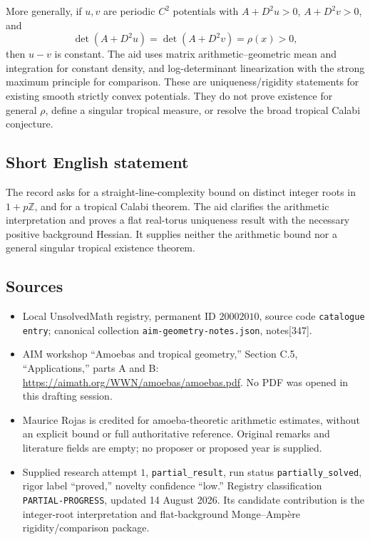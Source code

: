\documentclass[11pt]{article}
\newcommand{\Z}{\mathbb{Z}}
\begin{document}
More generally, if \(u,v\) are periodic \(C^2\) potentials with \(A+D^2u>0\), \(A+D^2v>0\), and
\[
 \det(A+D^2u)=\det(A+D^2v)=\rho(x)>0,
\]
then \(u-v\) is constant. The aid uses matrix arithmetic--geometric mean and integration for constant density, and log-determinant linearization with the strong maximum principle for comparison. These are uniqueness/rigidity statements for existing smooth strictly convex potentials. They do not prove existence for general \(\rho\), define a singular tropical measure, or resolve the broad tropical Calabi conjecture.
\subsection{Short English statement}
The record asks for a straight-line-complexity bound on distinct integer roots in \(1+p\Z\), and for a tropical Calabi theorem. The aid clarifies the arithmetic interpretation and proves a flat real-torus uniqueness result with the necessary positive background Hessian. It supplies neither the arithmetic bound nor a general singular tropical existence theorem.
\subsection{Sources}
\begin{itemize}
\item Local UnsolvedMath registry, permanent ID \(20002010\), source code \texttt{catalogue entry}; canonical collection \texttt{aim-geometry-notes.json}, notes[347].
\item AIM workshop ``Amoebas and tropical geometry,'' Section C.5, ``Applications,'' parts A and B: \url{https://aimath.org/WWN/amoebas/amoebas.pdf}. No PDF was opened in this drafting session.
\item Maurice Rojas is credited for amoeba-theoretic arithmetic estimates, without an explicit bound or full authoritative reference. Original remarks and literature fields are empty; no proposer or proposed year is supplied.
\item Supplied research attempt \(1\), \texttt{partial\_result}, run status \texttt{partially\_solved}, rigor label ``proved,'' novelty confidence ``low.'' Registry classification \texttt{PARTIAL-PROGRESS}, updated 14 August 2026. Its candidate contribution is the integer-root interpretation and flat-background Monge--Amp\`ere rigidity/comparison package.
\end{itemize}
\end{document}

